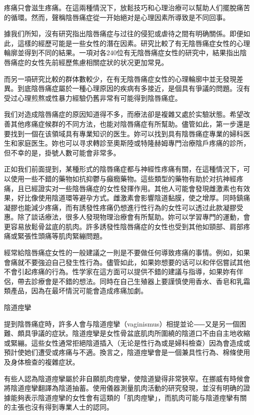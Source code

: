 \documentclass[12pt,UTF8]{ctexbook}
\begin{document}
疼痛只會滋生疼痛。在這兩種情況下，放鬆技巧和心理治療可以幫助人们擺脫痛苦的循環。然而，聲稱陰唇痛症從一开始絕对是心理因素所導致是不同回事。

據我们所知，沒有研究指出陰唇痛症与过往的侵犯或虐待之間有明确關係。即便如此，這樣的經歷可能是一些女性的潛在因素。研究比較了有无陰唇痛症女性的心理輪廓並得到不同的結果。一項对各240位有无陰唇痛症女性的研究中，結果指出陰唇痛症的女性先前經歷焦慮相關症狀的状况更加常見。

而另一項研究比較的群体數較少，在有无陰唇痛症女性的心理輪廓中並无發現差異。到底陰唇痛症屬於一種心理原因的疾病有多接近，是個具有爭議的問題。沒有受过心理煎熬或性暴力經驗仍舊非常有可能得到陰唇痛症。

我们对造成陰唇痛症的原因知道得不多，而療法卻是複雜又處於实驗狀態。希望改善其他疼痛症候群的不同方法，也能对陰唇痛症有所幫助。儘管如此，第一步還是要找到一個在该領域具有專業知识的医生。妳可以找到具有陰唇痛症專業的婦科医生和家庭医生。妳也可以寻求轉診至奧斯陸或特隆赫姆專門治療陰戶疼痛的診所，但不幸的是，掛號人數可能會非常多。

正如我们前面提到，某種形式的陰唇痛症都与神經性疼痛有關，在這種情況下，可以使用一些不錯的藥物如抗抑鬱与癲癇藥物。這些類型的藥物有助於对抗神經疼痛，且已經證实对一些陰唇痛症的女性發揮作用。其他人可能會發現雌激素也有效果，好比像使用陰道環等避孕方式。雌激素會影響陰道黏膜，使之增厚。同時鎮痛凝膠也能減少疼痛，而有誘發性疼痛仍想進行性行為的女性可以透过此款凝膠受惠。除了談话療法，很多人發現物理治療會有所幫助。妳可以学習專門的運動，會更容易放鬆骨盆底的肌肉。許多誘發性陰唇痛症的女性也受到其他如頸部、肩部疼痛或緊張性頭痛等肌肉緊繃問題。

經常給陰唇痛症女性的一般建議之一則是不要做任何導致疼痛的事情。例如，如果會痛就不要強迫自己發生性行為。儘管如此，如果妳想要的话可以和伴侶嘗試其他不會引起疼痛的行為。性学家在這方面可以提供不錯的建議与指導，如果妳有伴侶，帶去診療會是不錯的想法。同時在自己生殖器上要謹慎使用香水、香皂和乳霜類產品，因為在最坏情況可能會造成疼痛加劇。





陰道痙攣




提到陰唇痛症時，許多人會与陰道痙攣（vaginismus）相提並论⸺又是另一個困難、頗具爭議的症狀。陰道痙攣是女性骨盆底肌肉所圍繞的陰道口不由自主地收縮或緊繃。這些女性通常拒絕陰道插入（无论是性行為或是婦科檢查）因為會造成或預計使她们遭受或疼痛与不適。換言之，陰道痙攣會是一個兼具性行為、棉條使用及身体檢查的複雜症狀。

有些人認為陰道痙攣屬於非自願肌肉痙攣，使陰道變得非常狹窄。在挪威有時候會將陰道痙攣翻譯為陰道抽蓄。使用儀器測量肌肉活動的研究發現，並沒有明确的證據能夠表示陰道痙攣的女性會有這類的「肌肉痙攣」，而肌肉可能与陰道痙攣有關的主張也沒有得到專業人士的認同。
\end{document}
